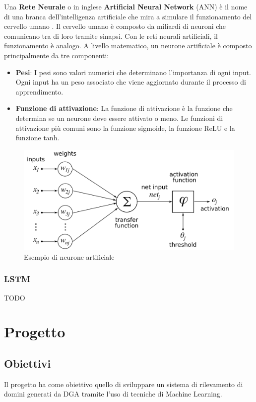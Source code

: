 \documentclass[12pt,a4paper,openright,twoside]{book}
\begin{document}
Una \textbf{Rete Neurale} o in inglese \textbf{Artificial Neural Network} (ANN) è il nome
di una branca dell'intelligenza artificiale che mira a simulare il
funzionamento del cervello umano \cite{zou2009overview}.
Il cervello umano è composto da miliardi di neuroni
che comunicano tra di loro tramite sinapsi.
Con le reti neurali artificiali, il funzionamento
è analogo. A livello matematico, un neurone artificiale è composto principalmente
da tre componenti:
\begin{itemize}
    \item \textbf{Pesi}: I pesi sono valori numerici che determinano
    l'importanza di ogni input. Ogni input ha un peso associato
    che viene aggiornato durante il processo di apprendimento.
    \item \textbf{Funzione di attivazione}: La funzione di attivazione
    è la funzione che determina se un neurone deve essere attivato
    o meno. Le funzioni di attivazione più comuni sono la funzione
    sigmoide, la funzione ReLU e la funzione tanh.
\end{itemize}

\begin{figure}
    \centering
    \includegraphics[width=.8\linewidth]{figures/ArtificialNeuronModel.png}
    \caption{Esempio di neurone artificiale \cite{wiki:xxx}}
    \label{fig:ANN}
\end{figure}

\subsection{LSTM}

TODO

\chapter{Progetto}
\section{Obiettivi}
Il progetto ha come obiettivo quello di sviluppare un sistema
di rilevamento di domini generati da \acrshort{DGA} tramite
l'uso di tecniche di Machine Learning. 
\end{document}
